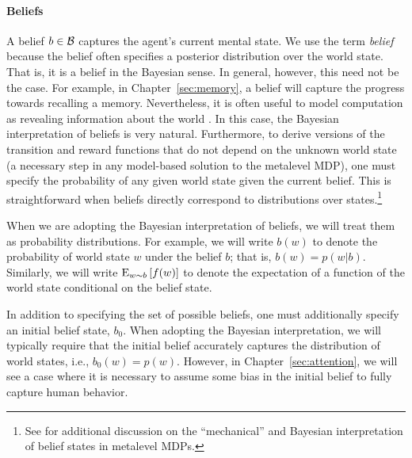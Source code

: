 \paragraph{Beliefs}
A belief $b \in \B$ captures the agent's current mental state. We use the term \emph{belief} because the belief often specifies a posterior distribution over the world state. That is, it is a belief in the Bayesian sense. In general, however, this need not be the case. For example, in Chapter~\ref{sec:memory}, a belief will capture the progress towards recalling a memory. Nevertheless, it is often useful to model computation as revealing information about the world \citep{matheson1968economic}. In this case, the Bayesian interpretation of beliefs is very natural. Furthermore, to derive versions of the transition and reward functions that do not depend on the unknown world state (a necessary step in any model-based solution to the metalevel MDP), one must specify the probability of any given world state given the current belief. This is straightforward when beliefs directly correspond to distributions over states.\footnote{See \citet[Chapter~7]{hay2016principles} for additional discussion on the ``mechanical'' and Bayesian interpretation of belief states in metalevel MDPs.}

When we are adopting the Bayesian interpretation of beliefs, we will treat them as probability distributions. For example, we will write $b(w)$ to denote the probability of world state $w$ under the belief $b$; that is, $b(w) = p(w | b)$. Similarly, we will write $\expectunder{f(w)}{w \sim b}$ to denote the expectation of a function of the world state conditional on the belief state.

In addition to specifying the set of possible beliefs, one must additionally specify an initial belief state, $b_0$. When adopting the Bayesian interpretation, we will typically require that the initial belief accurately captures the distribution of world states, i.e., $b_0(w) = p(w)$. However, in Chapter~\ref{sec:attention}, we will see a case where it is necessary to assume some bias in the initial belief to fully capture human behavior.



